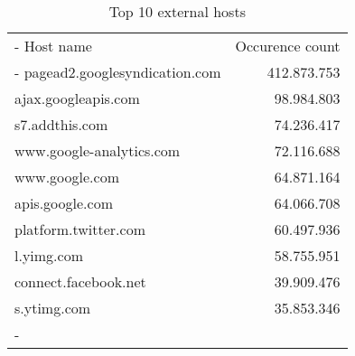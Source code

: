 \begin{table}
	\begin{tabu} to \columnwidth{|X|r|}
		\tabucline-
		\rowfont{\bfseries}
		Host name & Occurence count\\
		\tabucline-
		pagead2.googlesyndication.com	&	412.873.753 \\
		ajax.googleapis.com				&	98.984.803 \\
		s7.addthis.com 					&	74.236.417 \\
		www.google-analytics.com 		&	72.116.688 \\
		www.google.com					&	64.871.164 \\
		apis.google.com					&	64.066.708 \\
		platform.twitter.com			&	60.497.936 \\
		l.yimg.com						&	58.755.951 \\
		connect.facebook.net			&	39.909.476 \\
		s.ytimg.com						&	35.853.346 \\
		\tabucline-
	\end{tabu}
	\caption{Top 10 external hosts\label{tab:top_external_hosts}}
\end{table}